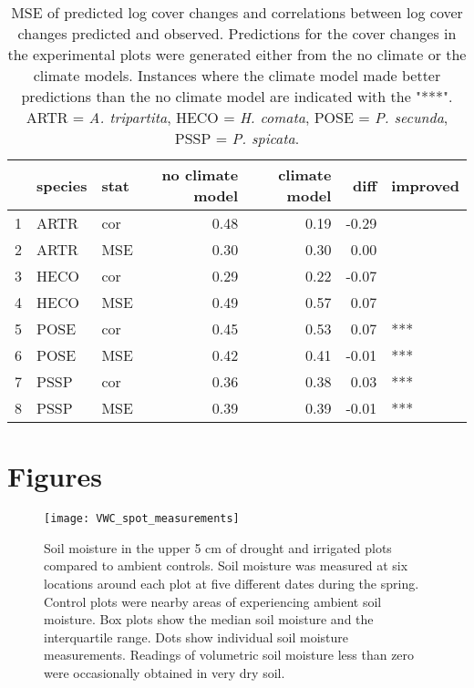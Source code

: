 \documentclass[11pt]{article}
\begin{document}
\begin{table}[ht]
	\centering
	\begin{tabular}{rllrrrl}
		\hline
		& species & stat & no climate model & climate model & diff & improved \\ 
		\hline
		1 & ARTR & cor & 0.48 & 0.19 & -0.29 &  \\ 
		2 & ARTR & MSE & 0.30 & 0.30 & 0.00 &  \\ 
		3 & HECO & cor & 0.29 & 0.22 & -0.07 &  \\ 
		4 & HECO & MSE & 0.49 & 0.57 & 0.07 &  \\ 
		5 & POSE & cor & 0.45 & 0.53 & 0.07 & *** \\ 
		6 & POSE & MSE & 0.42 & 0.41 & -0.01 & *** \\ 
		7 & PSSP & cor & 0.36 & 0.38 & 0.03 & *** \\ 
		8 & PSSP & MSE & 0.39 & 0.39 & -0.01 & *** \\ 
		\hline
	\end{tabular}
	\caption{MSE of predicted log cover changes and correlations between log cover changes predicted and observed. Predictions for the cover changes in the experimental plots were generated either from the no climate or the climate models. Instances where the climate model made better predictions than the no climate model are indicated with the "***". ARTR = \textit{A. tripartita}, HECO = \textit{H. comata}, POSE = \textit{P. secunda}, PSSP = \textit{P. spicata}.} 
	\label{table:corPGR}
\end{table}


\clearpage
\newpage


\section*{Figures}


\begin{figure}[!htbp]
	\centering
	\texttt{[image: VWC\_spot\_measurements]}
	\caption{Soil moisture in the upper 5 cm of drought and irrigated plots compared to ambient controls. Soil moisture was measured at six locations around each plot at five different dates during the spring. Control plots were nearby areas of experiencing ambient soil moisture. Box plots show the median soil moisture and the interquartile range.  Dots show individual soil moisture measurements. Readings of volumetric soil moisture less than zero were occasionally obtained in very dry soil.}
	\label{fig:spotVWC}
\end{figure}
\end{document}
